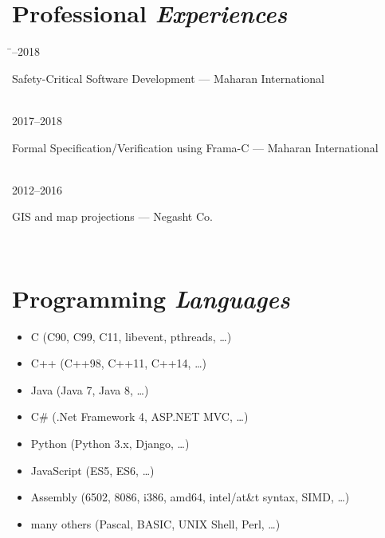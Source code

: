 \documentclass[a4paper,10pt]{article}
\newcommand{\follownote}[1]{--- {\footnotesize\color{darkblue}#1}}
\begin{document}
\section*{{\color{green}Professional \emph{Experiences}}}
\begin{tabbing}
\hspace{2.5cm}\=--2018 \>\parbox[t]{10.5cm}{
	Safety-Critical Software Development
	\follownote{Maharan International}
} \\[2mm]
2017--2018 \>\parbox[t]{10.5cm}{
	Formal Specification/Verification using Frama-C
	\follownote{Maharan International}
} \\[2mm]
2012--2016 \>\parbox[t]{10.5cm}{
	GIS and map projections
	\follownote{Negasht Co.}
} \\[2mm]
\end{tabbing}

\section*{{\color{purple}Programming \emph{Languages}}}
\begin{itemize}
	\item C (C90, C99, C11, libevent, pthreads, \ldots)
	\item C++ (C++98, C++11, C++14, \ldots)
	\item Java (Java 7, Java 8, \ldots)
	\item C\# (.Net Framework 4, ASP.NET MVC, \ldots)
	\item Python (Python 3.x, Django, \ldots)
	\item JavaScript (ES5, ES6, \ldots)
	\item Assembly (6502, 8086, i386, amd64, intel/at\&t syntax,
	    SIMD, \ldots)
	\item many others (Pascal, BASIC, UNIX Shell, Perl, \ldots)
\end{itemize}
\end{document}
